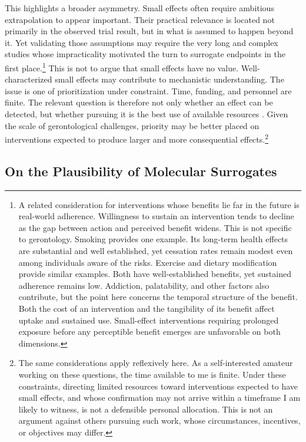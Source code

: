 \documentclass[twocolumn]{article} %
\begin{document}
This highlights a broader asymmetry. Small effects often require ambitious extrapolation to appear important. Their practical relevance is located not primarily in the observed trial result, but in what is assumed to happen beyond it. Yet validating those assumptions may require the very long and complex studies whose impracticality motivated the turn to surrogate endpoints in the first place.\footnote{A related consideration for interventions whose benefits lie far in the future is real-world adherence. Willingness to sustain an intervention tends to decline as the gap between action and perceived benefit widens. This is not specific to gerontology. Smoking provides one example. Its long-term health effects are substantial and well established, yet cessation rates remain modest even among individuals aware of the risks. Exercise and dietary modification provide similar examples. Both have well-established benefits, yet sustained adherence remains low. Addiction, palatability, and other factors also contribute, but the point here concerns the temporal structure of the benefit. Both the cost of an intervention and the tangibility of its benefit affect uptake and sustained use. Small-effect interventions requiring prolonged exposure before any perceptible benefit emerges are unfavorable on both dimensions.} This is not to argue that small effects have no value. Well-characterized small effects may contribute to mechanistic understanding. The issue is one of prioritization under constraint. Time, funding, and personnel are finite. The relevant question is therefore not only whether an effect can be detected, but whether pursuing it is the best use of available resources \citep[c]{keys2025emerging}. Given the scale of gerontological challenges, priority may be better placed on interventions expected to produce larger and more consequential effects.\footnote{The same considerations apply reflexively here. As a self-interested amateur working on these questions, the time available to me is finite. Under these constraints, directing limited resources toward interventions expected to have small effects, and whose confirmation may not arrive within a timeframe I am likely to witness, is not a defensible personal allocation. This is not an argument against others pursuing such work, whose circumstances, incentives, or objectives may differ.}

\subsection{On the Plausibility of Molecular Surrogates}
\end{document}
